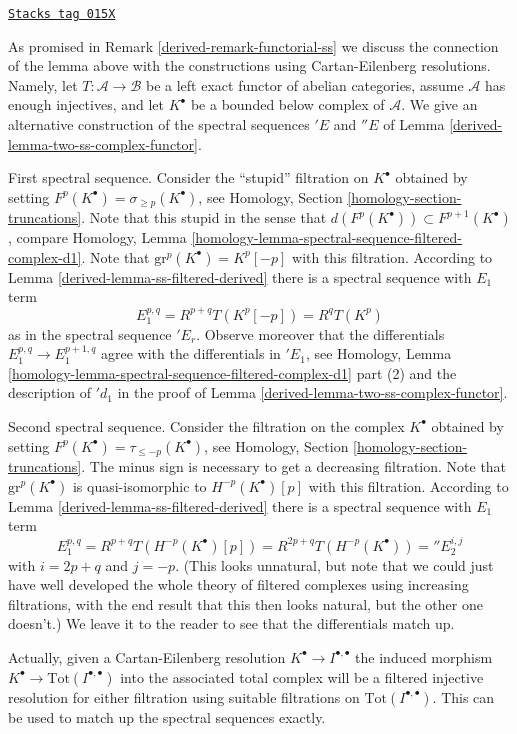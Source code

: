 \begin{remark}
\label{derived-remark-final-functorial}
\href{https://stacks.math.columbia.edu/tag/015X}{\texttt{Stacks tag 015X}}

As promised in Remark \ref{derived-remark-functorial-ss} we discuss the connection
of the lemma above with the constructions using Cartan-Eilenberg resolutions.
Namely, let $T : \mathcal{A} \to \mathcal{B}$ be a left exact functor
of abelian categories, assume $\mathcal{A}$
has enough injectives, and let $K^\bullet$ be a bounded below complex
of $\mathcal{A}$. We give an alternative construction of the
spectral sequences ${}'E$ and ${}''E$ of
Lemma \ref{derived-lemma-two-ss-complex-functor}.

\medskip\noindent
First spectral sequence. Consider the ``stupid'' filtration on $K^\bullet$
obtained by setting $F^p(K^\bullet) = \sigma_{\geq p}(K^\bullet)$, see
Homology, Section \ref{homology-section-truncations}.
Note that this stupid in the sense that
$d(F^p(K^\bullet)) \subset F^{p + 1}(K^\bullet)$, compare
Homology, Lemma \ref{homology-lemma-spectral-sequence-filtered-complex-d1}.
Note that $\text{gr}^p(K^\bullet) = K^p[-p]$ with this filtration.
According to Lemma \ref{derived-lemma-ss-filtered-derived} there is a spectral sequence
with $E_1$ term
$$
E_1^{p, q} = R^{p + q}T(K^p[-p]) = R^qT(K^p)
$$
as in the spectral sequence ${}'E_r$. Observe moreover that the differentials
$E_1^{p, q} \to E_1^{p + 1, q}$ agree with the differentials in $'{}E_1$, see
Homology, Lemma
\ref{homology-lemma-spectral-sequence-filtered-complex-d1} part (2)
and the description of ${}'d_1$ in the proof of
Lemma \ref{derived-lemma-two-ss-complex-functor}.

\medskip\noindent
Second spectral sequence. Consider the filtration on the complex $K^\bullet$
obtained by setting $F^p(K^\bullet) = \tau_{\leq -p}(K^\bullet)$, see
Homology, Section \ref{homology-section-truncations}.
The minus sign is necessary
to get a decreasing filtration. Note that
$\text{gr}^p(K^\bullet)$ is quasi-isomorphic to $H^{-p}(K^\bullet)[p]$
with this filtration. According to Lemma \ref{derived-lemma-ss-filtered-derived}
there is a spectral sequence with $E_1$ term
$$
E_1^{p, q} = R^{p + q}T(H^{-p}(K^\bullet)[p])
= R^{2p + q}T(H^{-p}(K^\bullet)) = {}''E_2^{i, j}
$$
with $i = 2p + q$ and $j = -p$. (This looks unnatural, but note that we
could just have well developed the whole theory of filtered complexes
using increasing filtrations, with the end result that this then looks
natural, but the other one doesn't.) We leave it to the reader to see
that the differentials match up.

\medskip\noindent
Actually, given a Cartan-Eilenberg resolution
$K^\bullet \to I^{\bullet, \bullet}$ the induced morphism
$K^\bullet \to \text{Tot}(I^{\bullet, \bullet})$
into the associated total complex
will be a filtered injective resolution for either filtration
using suitable filtrations on $\text{Tot}(I^{\bullet, \bullet})$.
This can be used
to match up the spectral sequences exactly.
\end{remark}

